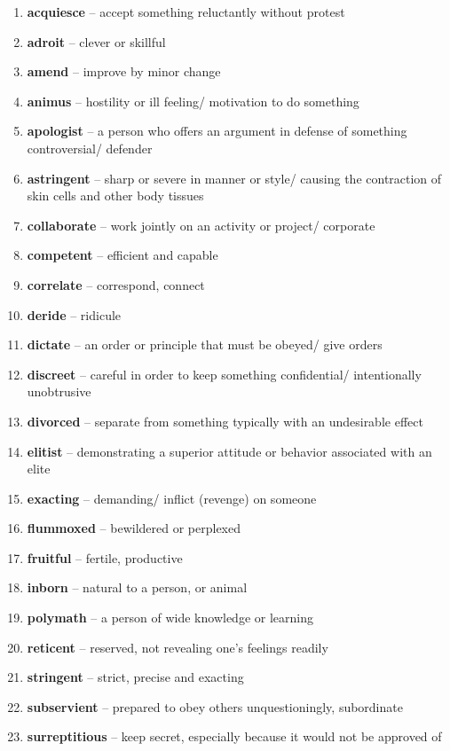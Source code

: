 \begin{enumerate}[wide,labelindent=0pt]
\item \textbf{acquiesce} -- accept something reluctantly without protest
\item \textbf{adroit} -- clever or skillful
\item \textbf{amend} -- improve by minor change
\item \textbf{animus} -- hostility or ill feeling/ motivation to do something
\item \textbf{apologist} -- a person who offers an argument in defense of something controversial/ defender
\item \textbf{astringent} -- sharp or severe in manner or style/ causing the contraction of skin cells and other body tissues
\item \textbf{collaborate} -- work jointly on an activity or project/ corporate
\item \textbf{competent} -- efficient and capable
\item \textbf{correlate} -- correspond, connect
\item \textbf{deride} -- ridicule
\item \textbf{dictate} -- an order or principle that must be obeyed/ give orders
\item \textbf{discreet} -- careful in order to keep something confidential/ intentionally unobtrusive
\item \textbf{divorced} -- separate from something typically with an undesirable effect
\item \textbf{elitist} -- demonstrating a superior attitude or behavior associated with an elite
\item \textbf{exacting} -- demanding/ inflict (revenge) on someone
\item \textbf{flummoxed} -- bewildered or perplexed
\item \textbf{fruitful} -- fertile, productive
\item \textbf{inborn} -- natural to a person, or animal
\item \textbf{polymath} -- a person of wide knowledge or learning
\item \textbf{reticent} -- reserved, not revealing one's feelings readily
\item \textbf{stringent} -- strict, precise and exacting
\item \textbf{subservient} -- prepared to obey others unquestioningly, subordinate
\item \textbf{surreptitious} -- keep secret, especially because it would not be approved of

\end{enumerate}
